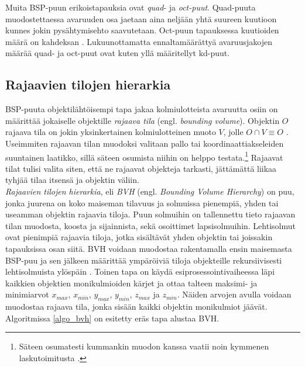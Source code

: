\documentclass[a4paper, 12pt, titlepage]{article}
\begin{document}


Muita BSP-puun erikoistapauksia ovat \emph{quad}- ja \emph{oct-puut}. Quad-puuta muodostettaessa avaruuden osa jaetaan aina neljään yhtä suureen kuutioon kunnes jokin pysähtymisehto saavutetaan. Oct-puun tapauksessa kuutioiden määrä on kahdeksan \citep[.]{samet}. Lukuunottamatta ennaltamäärättyä avaruusjakojen määrää quad- ja oct-puut ovat kuten yllä määritellyt kd-puut.

\subsection{Rajaavien tilojen hierarkia}

BSP-puuta objektilähtöisempi tapa jakaa kolmiulotteista avaruutta osiin on määrittää jokaiselle objektille \emph{rajaava tila} (engl. \emph{bounding volume}). Objektin $O$ rajaava tila on jokin yksinkertainen kolmiulotteinen muoto $V$, jolle $O \cap V \equiv O$ \citep{havran}. Useimmiten rajaavan tilan muodoksi valitaan pallo tai koordinaattiakseleiden suuntainen laatikko, sillä säteen osumista niihin on helppo testata.\footnote{Säteen osumatesti kummankin muodon kanssa vaatii noin kymmenen laskutoimitusta \citep{goldsmith}.} Rajaavat tilat tulisi valita siten, että ne rajaavat objekteja tarkasti, jättämättä liikaa tyhjää tilaa itsensä ja objektin väliin. \citep{hughes} \\

\emph{Rajaavien tilojen hierarkia}, eli \emph{BVH} (engl. \emph{Bounding Volume Hierarchy}) on puu, jonka juurena on koko maiseman tilavuus ja solmuissa pienempiä, yhden tai useamman objektin rajaavia tiloja. Puun solmuihin on tallennettu tieto rajaavan tilan muodosta, koosta ja sijainnista, sekä osoittimet lapsisolmuihin. Lehtisolmut ovat pienimpiä rajaavia tiloja, jotka sisältävät yhden objektin tai joissakin tapauksissa osan siitä. BVH voidaan muodostaa rakentamalla ensin maisemasta BSP-puu ja sen jälkeen määrittää ympäröiviä tiloja objekteille rekursiivisesti lehtisolmuista ylöspäin \citep{hughes}. Toinen tapa on käydä esiprosessointivaiheessa läpi kaikkien objektien monikulmioiden kärjet ja ottaa talteen maksimi- ja minimiarvot $x_{max}$, $x_{min}$, $y_{max}$, $y_{min}$, $z_{max}$ ja $z_{min}$. Näiden arvojen avulla voidaan muodostaa rajaava tila, jonka sisään kaikki objektin monikulmiot jäävät. \citep[.]{janke} Algoritmissa \ref{algo_bvh} on esitetty eräs tapa alustaa BVH.\\


\end{document}
